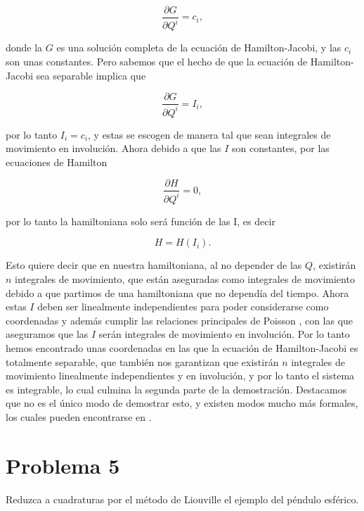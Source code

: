 \documentclass[a4paper,10pt]{article}
\numberwithin{equation}{section}
\begin{document}
\begin{equation}
 \frac{\partial G}{\partial Q^i} = c_i, 
\end{equation}

donde la $G$ es una solución completa de la ecuación de Hamilton-Jacobi, y las 
$c_i$ son unas constantes. Pero sabemos que el hecho de que la ecuación de Hamilton-
Jacobi sea separable implica que 

\begin{equation}
 \frac{\partial G}{\partial Q^i} = I_i,
\end{equation}

por lo tanto $I_i = c_i$, y estas se escogen de manera tal que sean integrales de
movimiento en involución. Ahora debido a que las $I$ son constantes, por las ecuaciones 
de Hamilton 

\begin{equation}
 \frac{\partial H}{\partial Q^i} = 0,
\end{equation}

por lo tanto la hamiltoniana solo será función de las I, es decir 

\begin{equation}
 H = H(I_i).
\end{equation}

Esto quiere decir que en nuestra hamiltoniana, al no depender de las $Q$, existirán 
$n$ integrales de movimiento, que están aseguradas como integrales de movimiento debido 
a que partimos de una hamiltoniana que no dependía del tiempo. Ahora estas $I$ deben 
ser linealmente independientes para poder considerarse como coordenadas y además cumplir 
las relaciones principales de Poisson \cite{abraham}, con las que aseguramos que las $I$ serán integrales 
de movimiento en involución. Por lo tanto hemos encontrado unas coordenadas en las que la ecuación 
de Hamilton-Jacobi es totalmente separable, que también nos garantizan que existirán
$n$ integrales de movimiento linealmente independientes y en involución, y por lo tanto el sistema
es integrable, lo cual  culmina la segunda parte de la  demostración. Destacamos que no es el 
único modo de demostrar  esto, y existen modos mucho más formales, los cuales pueden 
encontrarse en \cite{abraham}.

\section{Problema 5}


Reduzca a cuadraturas por el método de Liouville el ejemplo del péndulo esférico.
\end{document}
